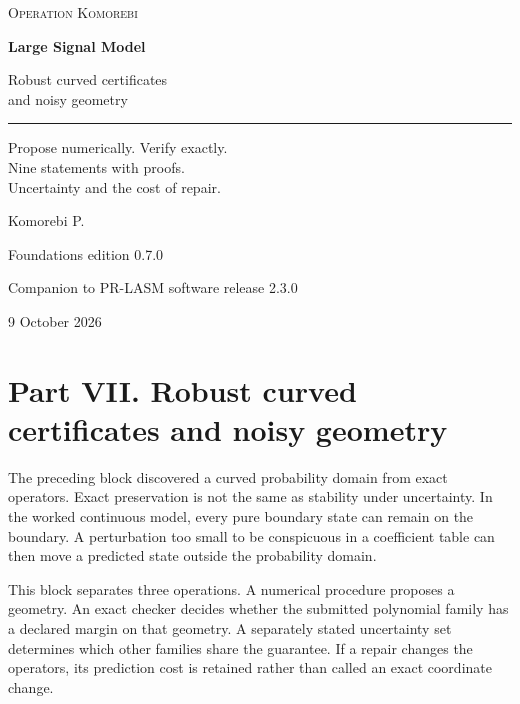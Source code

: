 \documentclass[11pt,letterpaper]{article}
\begin{document}
\hypersetup{pageanchor=false}
\begin{titlepage}
\vspace*{0.5in}
{\small\textsc{Operation Komorebi}\par}
\vspace{0.72in}
{\fontsize{33}{39}\selectfont\bfseries Large Signal Model\par}
\vspace{0.3in}
{\fontsize{21}{27}\selectfont Robust curved certificates\\and noisy geometry\par}
\vspace{0.45in}
\rule{\textwidth}{0.45pt}\par
\vspace{0.3in}
\begin{minipage}{0.95\textwidth}
\large
Propose numerically. Verify exactly.\\Nine statements with proofs.\\Uncertainty and the cost of repair.
\end{minipage}
\vfill
{\Large Komorebi P.\par}
\vspace{0.2in}
{\normalsize Foundations edition 0.7.0\par}
{\normalsize Companion to PR-LASM software release 2.3.0\par}
{\normalsize 9 October 2026\par}
\end{titlepage}
\hypersetup{pageanchor=true}
\begingroup
\footnotesize
\setlength{\cftbeforesecskip}{1pt}
\tableofcontents
\endgroup
\newpage

\section{Part VII. Robust curved certificates and noisy
geometry}\label{part-vii.-robust-curved-certificates-and-noisy-geometry}

The preceding block discovered a curved probability domain from exact
operators. Exact preservation is not the same as stability under
uncertainty. In the worked continuous model, every pure boundary state
can remain on the boundary. A perturbation too small to be conspicuous
in a coefficient table can then move a predicted state outside the
probability domain.

This block separates three operations. A numerical procedure proposes a
geometry. An exact checker decides whether the submitted polynomial
family has a declared margin on that geometry. A separately stated
uncertainty set determines which other families share the guarantee. If
a repair changes the operators, its prediction cost is retained rather
than called an exact coordinate change.
\end{document}
